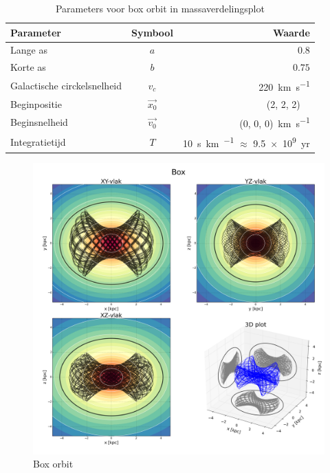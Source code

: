 \documentclass[11pt,a4paper,twoside,dutch]{article}
\begin{document}
\begin{table}[t]
\centering
\begin{tabular}{lcr}
	\hline
	\textbf{Parameter} & \textbf{Symbool} & \textbf{Waarde} \\
	\hline
	Lange as & $a$ & $0.8$\\
	Korte as & $b$ & $0.75$\\
	Galactische circkelsnelheid & $v_c$ & \SI{220}{\kilo\meter\per\second}\\
	Beginpositie & $\vec{x_0}$ & (2, 2, 2)~\si{\kilo\parsec}\\
	Beginsnelheid & $\vec{v_0}$ & (0, 0, 0)~\si{\kilo\meter\per\second}\\
	Integratietijd & $T$ & \SI{10}{\second\kilo\meter\per\parsec} $\approx$ \num{9.5e9}~yr \\
	\hline
\end{tabular}
\caption{Parameters voor box orbit in massaverdelingsplot}
\label{tab:massparam}
\end{table}

\newpage

\begin{figure}[b]
\centering
\includegraphics[width=1\textwidth]{img/box.png}
\caption{Box orbit}
\label{fig:boxplot}
\end{figure}
\end{document}
